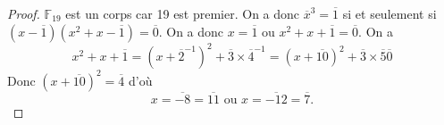 \begin{proof}
	$\mathbb{F}_{19}$ est un corps car 19 est premier. On a donc $\overline{x}^{3}=\overline{1}$ si et seulement si $(x-\overline{1})(x^{2}+x-\overline{1})=\overline{0}$. On a donc $x=\overline{1}$ ou $x^{2}+x+\overline{1}=\overline{0}$.
	On a 
	\begin{equation}
		x^{2}+x+\overline{1}=(x+\overline{2}^{-1})^{2}+\overline{3}\times\overline{4}^{-1}=(x+\overline{10})^{2}+\overline{3}\times\overline{5}\overline{0}
	\end{equation}
	Donc $(x+\overline{10})^{2}=\overline{4}$ d'où 
	\begin{equation}
		\boxed{x=\overline{-8}=\overline{11}\text{ ou }x=\overline{-12}=\overline{7}.}
	\end{equation}
\end{proof}

